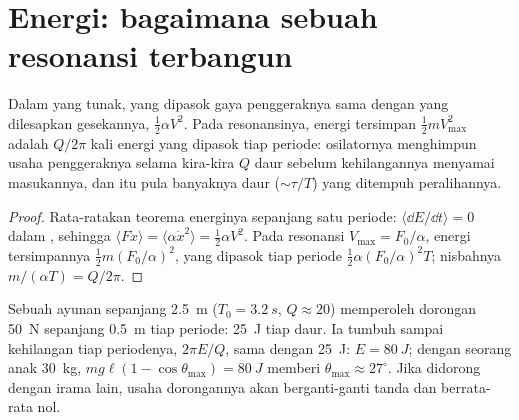 \section{Energi: bagaimana sebuah resonansi terbangun}

\begin{proposition}\label{prop:b1:oscillators-resonance:energy}
Dalam  yang tunak,  yang dipasok gaya
penggeraknya sama dengan  yang dilesapkan gesekannya,
$\tfrac12\alpha V^2$. Pada resonansinya, energi tersimpan
$\tfrac12 mV_{\max}^2$ adalah $Q/2\pi$ kali energi yang dipasok tiap
periode: osilatornya menghimpun usaha penggeraknya selama kira-kira $Q$
daur sebelum kehilangannya menyamai masukannya, dan itu pula banyaknya
daur ($\sim\tau/T$) yang ditempuh peralihannya.
\end{proposition}

\begin{proof}
Rata-ratakan teorema energinya sepanjang satu periode:
$\langle\dd E/\dd t\rangle = 0$ dalam , sehingga
$\langle F\dot x\rangle = \langle\alpha\dot x^2\rangle =
\tfrac12\alpha V^2$. Pada resonansi $V_{\max} = F_0/\alpha$, energi
tersimpannya $\tfrac12 m(F_0/\alpha)^2$, yang dipasok tiap periode
$\tfrac12\alpha(F_0/\alpha)^2T$; nisbahnya $m/(\alpha T) = Q/2\pi$.
\end{proof}

\begin{example}[Ayunannya]\label{ex:b1:oscillators-resonance:swing}
Sebuah ayunan sepanjang \qty{2.5}{m} ($T_0 = \qty{3.2}{s}$, $Q \approx 20$)
memperoleh dorongan \qty{50}{N} sepanjang \qty{0.5}{m} tiap periode:
\qty{25}{J} tiap daur. Ia tumbuh sampai kehilangan tiap periodenya,
$2\pi E/Q$, sama dengan \qty{25}{J}: $E = \qty{80}{J}$; dengan seorang
anak \qty{30}{kg}, $mg\ell(1 -
\cos\theta_{\max}) = \qty{80}{J}$ memberi $\theta_{\max} \approx 27^\circ$.
Jika didorong dengan irama lain, usaha dorongannya akan berganti-ganti
tanda dan berrata-rata nol.
\end{example}

